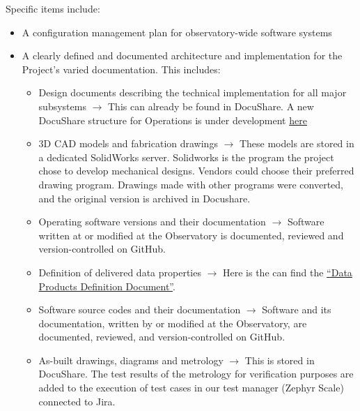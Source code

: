 Specific items include:

\begin{itemize}
	\item A configuration management plan for observatory-wide software systems

	\item A clearly defined and documented architecture and implementation for the Project's varied documentation.  This includes:
	\begin{itemize}
		\item Design documents describing the technical implementation for all major subsystems\newline
		$\rightarrow$ This can already be found in DocuShare.
		A new DocuShare structure for Operations is under development \href{https://docushare.lsst.org/docushare/dsweb/View/Collection-15974}{here}

		\item 3D CAD models and fabrication drawings\newline
		$\rightarrow$ These models are stored in a dedicated SolidWorks server. Solidworks is the program the project chose to develop mechanical designs.
		Vendors could choose their preferred drawing program. Drawings made with other programs were converted, and the original version is archived in Docushare.

		\item Operating software versions and their documentation\newline
		$\rightarrow$ Software written at or modified at the Observatory is documented, reviewed and version-controlled on GitHub.

		\item Definition of delivered data properties\newline
		$\rightarrow$ Here is the can find the \href{ls.st/dpdd}{“Data Products Definition Document”}.
		\item Software source codes and their documentation\newline
		$\rightarrow$ Software and its documentation, written by or modified at the Observatory, are documented, reviewed, and version-controlled on GitHub.

		\item As-built drawings, diagrams and metrology\newline
		$\rightarrow$ This is stored in DocuShare.
		The test results of the metrology for verification purposes are added to the execution of test cases in our test manager (Zephyr Scale) connected to Jira.


\end{itemize}
\end{itemize}
